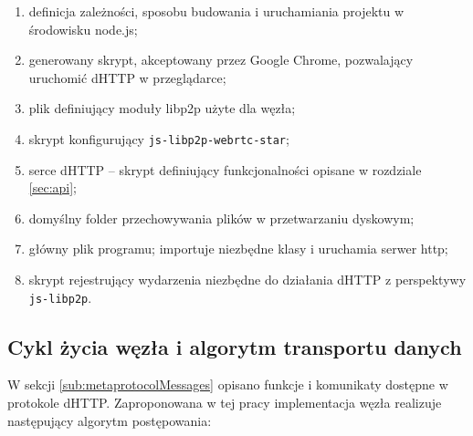 \begin{enumerate}[noitemsep]
    \item definicja zależności, sposobu budowania i uruchamiania projektu w środowisku node.js;
    \item generowany skrypt, akceptowany przez Google Chrome, pozwalający uruchomić dHTTP w przeglądarce;
    \item plik definiujący moduły libp2p użyte dla węzła;
    \item skrypt konfigurujący \texttt{js-libp2p-webrtc-star};
    \item serce dHTTP -- skrypt definiujący funkcjonalności opisane w rozdziale \ref{sec:api};
    \item domyślny folder przechowywania plików w przetwarzaniu dyskowym;
    \item główny plik programu; importuje niezbędne klasy i uruchamia serwer http;
    \item skrypt rejestrujący wydarzenia niezbędne do działania dHTTP z perspektywy \texttt{js-libp2p}.
\end{enumerate}

\subsection{Cykl życia węzła i algorytm transportu danych}
\label{sec:transportAlgorithm}
W sekcji \ref{sub:metaprotocolMessages} opisano funkcje i komunikaty dostępne w protokole dHTTP. Zaproponowana w tej pracy implementacja węzła realizuje następujący algorytm postępowania:

